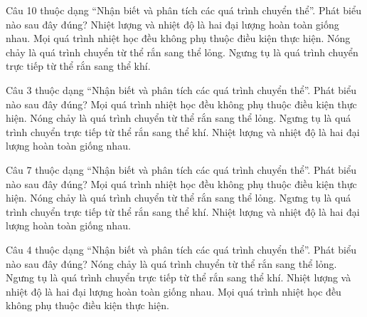 \begin{ex}
Câu 10 thuộc dạng “Nhận biết và phân tích các quá trình chuyển thể”. Phát biểu nào sau đây đúng?
\choice
{Nhiệt lượng và nhiệt độ là hai đại lượng hoàn toàn giống nhau.}
{Mọi quá trình nhiệt học đều không phụ thuộc điều kiện thực hiện.}
{\True Nóng chảy là quá trình chuyển từ thể rắn sang thể lỏng.}
{Ngưng tụ là quá trình chuyển trực tiếp từ thể rắn sang thể khí.}
\end{ex}

\begin{ex}
Câu 3 thuộc dạng “Nhận biết và phân tích các quá trình chuyển thể”. Phát biểu nào sau đây đúng?
\choice
{Mọi quá trình nhiệt học đều không phụ thuộc điều kiện thực hiện.}
{\True Nóng chảy là quá trình chuyển từ thể rắn sang thể lỏng.}
{Ngưng tụ là quá trình chuyển trực tiếp từ thể rắn sang thể khí.}
{Nhiệt lượng và nhiệt độ là hai đại lượng hoàn toàn giống nhau.}
\end{ex}

\begin{ex}
Câu 7 thuộc dạng “Nhận biết và phân tích các quá trình chuyển thể”. Phát biểu nào sau đây đúng?
\choice
{Mọi quá trình nhiệt học đều không phụ thuộc điều kiện thực hiện.}
{\True Nóng chảy là quá trình chuyển từ thể rắn sang thể lỏng.}
{Ngưng tụ là quá trình chuyển trực tiếp từ thể rắn sang thể khí.}
{Nhiệt lượng và nhiệt độ là hai đại lượng hoàn toàn giống nhau.}
\end{ex}

\begin{ex}
Câu 4 thuộc dạng “Nhận biết và phân tích các quá trình chuyển thể”. Phát biểu nào sau đây đúng?
\choice
{\True Nóng chảy là quá trình chuyển từ thể rắn sang thể lỏng.}
{Ngưng tụ là quá trình chuyển trực tiếp từ thể rắn sang thể khí.}
{Nhiệt lượng và nhiệt độ là hai đại lượng hoàn toàn giống nhau.}
{Mọi quá trình nhiệt học đều không phụ thuộc điều kiện thực hiện.}
\end{ex}

